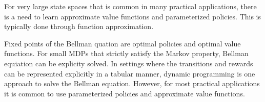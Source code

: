 For very large state spaces that is common in many practical applications, there is a need to learn
approximate value functions and parameterized policies.
This is typically done through function approximation.


Fixed points of the Bellman quation are optimal policies and optimal value functions.
For small MDPs that strictly satisfy the Markov property, Bellman equiation can be explicity
solved.
In settings where the transitions and rewards can be represented explicitly in a tabular manner,
dynamic programming is one approach to solve the Bellman equation.
However, for most practical applications it is common to use parameterized policies and approximate
value functions.


